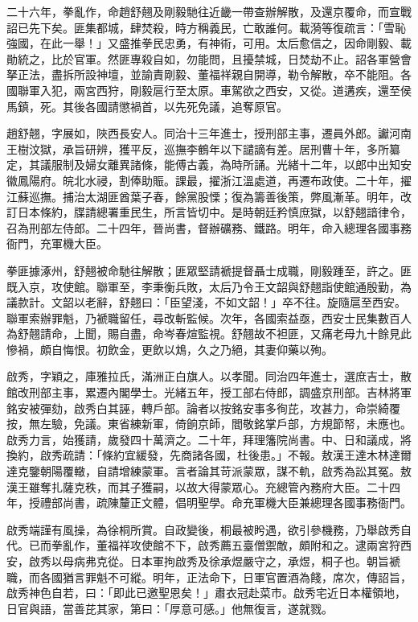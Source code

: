 \begin{pinyinscope}
二十六年，拳亂作，命趙舒翹及剛毅馳往近畿一帶查辦解散，及還京覆命，而宣戰詔已先下矣。匪集都城，肆焚殺，時方稱義民，亡敢誰何。載漪等復疏言：「雪恥強國，在此一舉！」又盛推拳民忠勇，有神術，可用。太后愈信之，因命剛毅、載勛統之，比於官軍。然匪專殺自如，勿能問，且擾禁城，日焚劫不止。詔各軍營會拏正法，盡拆所設神壇，並諭責剛毅、董福祥親自開導，勒令解散，卒不能阻。各國聯軍入犯，兩宮西狩，剛毅扈行至太原。車駕欲之西安，又從。道遘疾，還至侯馬鎮，死。其後各國請懲禍首，以先死免議，追奪原官。

趙舒翹，字展如，陜西長安人。同治十三年進士，授刑部主事，遷員外郎。讞河南王樹汶獄，承旨研辨，獲平反，巡撫李鶴年以下譴謫有差。居刑曹十年，多所纂定，其議服制及婦女離異諸條，能傅古義，為時所誦。光緒十二年，以郎中出知安徽鳳陽府。皖北水祲，割俸助賑。課最，擢浙江溫處道，再遷布政使。二十年，擢江蘇巡撫。捕治太湖匪酋葉子春，餘黨股慄；復為籌善後策，弊風漸革。明年，改訂日本條約，牒請總署重民生，所言皆切中。是時朝廷矜慎庶獄，以舒翹諳律令，召為刑部左侍郎。二十四年，晉尚書，督辦礦務、鐵路。明年，命入總理各國事務衙門，充軍機大臣。

拳匪據涿州，舒翹被命馳往解散；匪眾堅請褫提督聶士成職，剛毅踵至，許之。匪既入京，攻使館。聯軍至，李秉衡兵敗，太后乃令王文韶與舒翹詣使館通殷勤，為議款計。文韶以老辭，舒翹曰：「臣望淺，不如文韶！」卒不往。旋隨扈至西安。聯軍索辦罪魁，乃褫職留任，尋改斬監候。次年，各國索益亟，西安士民集數百人為舒翹請命，上聞，賜自盡，命岑春煊監視。舒翹故不袒匪，又痛老母九十餘見此慘禍，頗自悔恨。初飲金，更飲以鴆，久之乃絕，其妻仰藥以殉。

啟秀，字穎之，庫雅拉氏，滿洲正白旗人。以孝聞。同治四年進士，選庶吉士，散館改刑部主事，累遷內閣學士。光緒五年，授工部右侍郎，調盛京刑部。吉林將軍銘安被彈劾，啟秀白其誣，轉戶部。論者以按銘安事多徇芘，攻甚力，命崇綺覆按，無左驗，免議。東省練新軍，倚餉京師，閻敬銘掌戶部，方規節帑，未應也。啟秀力言，始獲請，歲發四十萬濟之。二十年，拜理籓院尚書。中、日和議成，將換約，啟秀疏請：「條約宜緩發，先商諸各國，杜後患。」不報。敖漢王達木林達爾達克鑒朝陽覆轍，自請增練蒙軍。言者論其苛派蒙眾，謀不軌，啟秀為訟其冤。敖漢王雖奪扎薩克秩，而其子獲嗣，以故大得蒙眾心。充總管內務府大臣。二十四年，授禮部尚書，疏陳釐正文體，倡明聖學。命充軍機大臣兼總理各國事務衙門。

啟秀端謹有風操，為徐桐所賞。自政變後，桐最被盻遇，欲引參機務，乃舉啟秀自代。已而拳亂作，董福祥攻使館不下，啟秀薦五臺僧禦敵，頗附和之。逮兩宮狩西安，啟秀以母病弗克從。日本軍拘啟秀及徐承煜嚴守之，承煜，桐子也。朝旨褫職，而各國猶言罪魁不可縱。明年，正法命下，日軍官置酒為餞，席次，傳詔旨，啟秀神色自若，曰：「即此已邀聖恩矣！」肅衣冠赴菜市。啟秀宅近日本權領地，日官與語，當善芘其家，第曰：「厚意可感。」他無復言，遂就戮。


\end{pinyinscope}
